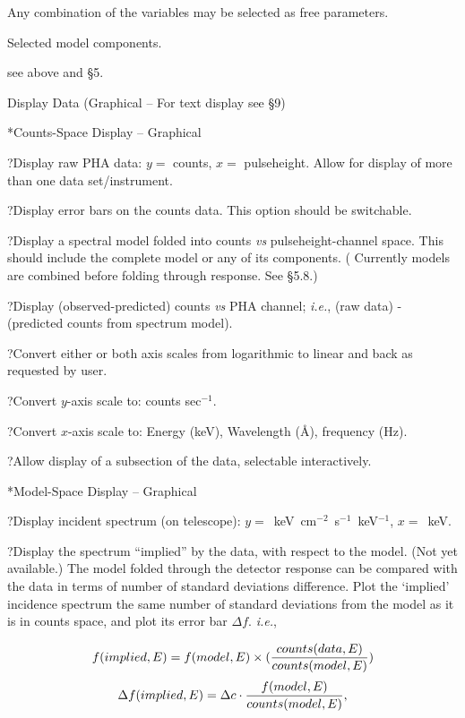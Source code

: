 {\list

Any combination of the variables may be selected as free parameters.


Selected model components.


see above and \S5.

}

\@{Display Data} (Graphical -- For text display see \S9)

\**Counts-Space Display -- Graphical

\??Display raw PHA data:  $y=$ counts, $x=$ pulseheight.  Allow for display of
more than one data set/instrument.

\??Display error bars on the counts data.  This option should be switchable.

\??Display a spectral model folded into counts {\it vs} pulseheight-channel
space.  This should include the complete model or any of its
components.  ( Currently models are combined
before folding through response. See \S 5.8.)

\??Display (observed-predicted) counts {\it vs} PHA channel; 
{\it i.e.}, (raw data) -
(predicted counts from spectrum model).

\??Convert either or both axis scales from logarithmic to linear and
back as requested by user.

\??Convert $y$-axis scale to:  counts sec$^{-1}$.

\??Convert $x$-axis scale to:  Energy (keV), Wavelength (\AA), frequency
(Hz).

\??Allow display of a subsection of the data, selectable interactively.

\**Model-Space Display -- Graphical

\??Display incident spectrum (on telescope):
$y=$~keV~cm$^{-2}$~s$^{-1}$~keV$^{-1}$, $x=$~keV.

\??Display the spectrum ``implied'' by the data, with respect to
the model. (Not yet available.) The model folded through the detector response can be
compared with the data in terms of number of standard deviations
difference.  Plot the `implied' incidence spectrum the same number
of standard deviations from the model as it is in counts space, and plot its
error bar $\Delta f$. {\it i.e.},

$$f(implied,E) = f(model, E) \times ({counts(data,E)\over counts(model, E)})$$
$$\Delta f(implied,E) = \Delta c \cdot {f(model,E)\over counts(model,E)},$$

